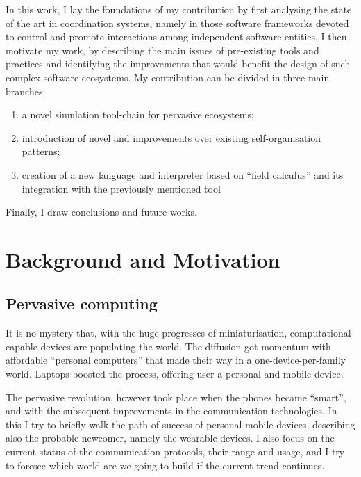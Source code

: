 \documentclass[12pt,a4paper,twoside,openright]{book}
\begin{document}
In this work, I lay the foundations of my contribution by first analysing the state of the art in coordination systems, namely in those software frameworks devoted to control and promote interactions among independent software entities.
%
I then motivate my work, by describing the main issues of pre-existing tools and practices and identifying the improvements that would benefit the design of such complex software ecosystems.
%
My contribution can be divided in three main branches:
\begin{enumerate}
 \item a novel simulation tool-chain for pervasive ecosystems;
 \item introduction of novel and improvements over existing self-organisation patterns;
 \item creation of a new language and interpreter based on ``field calculus'' and its integration with the previously mentioned tool
\end{enumerate}
%
Finally, I draw conclusions and future works.

\mainmatter

\pagestyle{fancy}
\fancyhead[LE,RO]{\bfseries\thepage}

\part{Background and Motivation}
\label{background}
\chapter{Pervasive computing}
\label{pervasive-devices}

It is no mystery that, with the huge progresses of miniaturisation, computational-capable devices are populating the world.
%
The diffusion got momentum with affordable ``personal computers'' that made their way in a one-device-per-family world.
%
Laptops boosted the process, offering user a personal and mobile device.

The pervasive revolution, however took place when the phones became ``smart'', and with the subsequent improvements in the communication technologies.
%
In this\levelText{} I try to briefly walk the path of success of personal mobile devices, describing also the probable newcomer, namely the wearable devices.
%
I also focus on the current status of the communication protocols, their range and usage, and I try to foresee which world are we going to build if the current trend continues.
\end{document}
